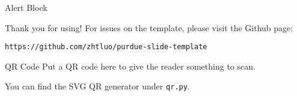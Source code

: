 \documentclass[20pt]{purdue-poster}
\begin{document}
\begin{frame}{}
\begin{columns}[c]
\begin{column}{.48\linewidth}
\begin{alertblock}{Alert Block}
    \bigskip
    
    \lipsum[7]
    \end{alertblock}

    \begin{block}{Thank you for using!}
        For issues on the template, please visit the Github page:
        
        {\small\texttt{https://github.com/zhtluo/purdue-slide-template}\par}
    \end{block}

    \begin{block}{\large QR Code}
        Put a QR code here to give the reader something to scan.

        You can find the SVG QR generator under \texttt{qr.py}.

        \begin{figure}
            {\centering}
        \end{figure}
    \end{block}
    \end{column}
    \end{columns}
    \vfill
\end{frame}
\end{document}
